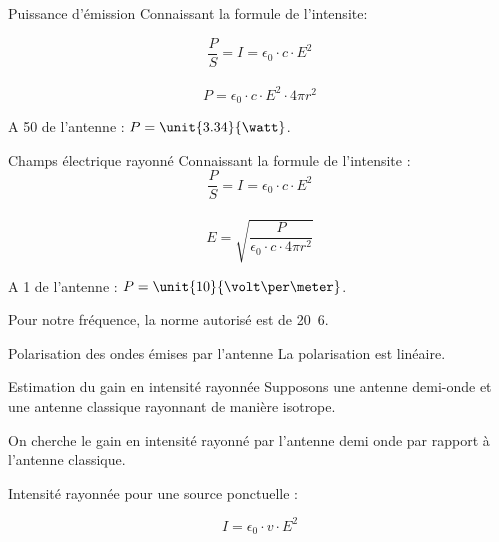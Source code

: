 \documentclass[pdf]{beamer}
\begin{document}
\begin{frame}{Puissance d'émission}
	Connaissant la formule de l'intensite:

	$$\frac{P}{S}=I=\epsilon_0 \cdot c \cdot E^2 $$\\ 

	$$P=\epsilon_0 \cdot c \cdot E^2 \cdot 4 \pi  r^2$$
	
	\begin{center}
		A \unit{50}{\meter} de l'antenne : $P= \unit{3.34}{\watt}$.
	\end{center}
\end{frame}

\begin{frame}{Champs électrique rayonné}
	Connaissant la formule de l'intensite :
	$$\frac{P}{S}=I=\epsilon_0 \cdot c \cdot E^2 $$\\

	$$E =\sqrt{\frac{P}{\epsilon_0 \cdot c \cdot 4\pi r^2}}$$

	A \unit{1}{\meter} de l'antenne : $P= \unit{10}{\volt\per\meter}$. 

	Pour notre fréquence, la norme autorisé est de \unit{20.6}{\volt\per\meter}.
\end{frame}

\begin{frame}{Polarisation des ondes émises par l'antenne}
	La polarisation est linéaire.
\end{frame}

\begin{frame}{Estimation du gain en intensité rayonnée}
Supposons une antenne demi-onde et une antenne classique rayonnant de manière isotrope.

On cherche le gain en intensité rayonné par l'antenne demi onde par rapport à l'antenne classique.

Intensité rayonnée pour une source ponctuelle :

$$I = \epsilon_0\cdot v\cdot E^2$$
\end{frame}
\end{document}
